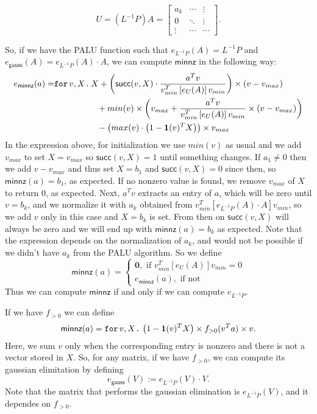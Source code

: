 \[
U=(L^{-1}P)A = \begin{bmatrix}
    a_k & \cdots &  \vdots \\
    0 & \ddots & \vdots \\
    \vdots & \cdots & \cdots 
\end{bmatrix}.
\]

So, if we have the PALU function such that $e_{L^{-1}P}(A)=L^{-1}P$ and $e_{\mathsf{gauss}}(A)=e_{L^{-1}P}(A)\cdot A$, we can compute $\mathsf{minnz}$ in the following way:
\begin{align*}
    e_{\mathsf{minnz}}(a)=&\texttt{for}\, v,X \texttt{.}\, X+\left( \mathsf{succ}(v,X)\cdot\dfrac{a^Tv}{v_{min}^T\left[ e_{U}(A)\right]v_{min}} \right)\times (v-v_{max}) \\
    &\hspace{5em} + min(v)\times\left( v_{max} + \dfrac{a^Tv}{v_{min}^T\left[ e_{U}(A)\right]v_{min}}\times (v-v_{max})\right) \\
    &\hspace{5em} - \left( max(v)\cdot\left( 1-\mathbf{1}(v)^TX \right)\right)\times v_{max}
\end{align*}
In the expression above, for initialization we use $min(v)$ as usual and we add $v_{max}$ to set $X=v_{max}$ so $\mathsf{succ}(v,X)=1$ until something changes. If $a_1\neq 0$ then we add $v-v_{max}$ and thus set $X=b_1$ and $\mathsf{succ}(v,X)=0$ since then, so $\mathsf{minnz}(a)=b_1$, as expected. If no nonzero value is found, we remove $v_{max}$ of $X$ to return $0$, as expected.
Next, $a^Tv$ extracts an entry of $a$, which will be zero until $v=b_k$, and we normalize it with $a_k$ obtained from $v_{min}^T\left[ e_{L^{-1}P}(A)\cdot A\right]v_{min}$, so we add $v$ only in this case and $X=b_k$ is set. From then on $\mathsf{succ}(v,X)$ will always be zero and we will end up with $\mathsf{minnz}(a)=b_k$ as expected. 
Note that the expression depends on the normalization of $a_k$, and would not be possible if we didn't have $a_k$ from the PALU algorithm.
So we define
\[
\mathsf{minnz}(a)=\begin{cases}
               \mathbf{0}, \text{ if } v_{min}^T\left[ e_{U}(A)\right]v_{min}=0 \\
               e_{\mathsf{minnz}}(a), \text{ if not}
            \end{cases}
\]
Thus we can compute $\mathsf{minnz}$ if and only if we can compute $e_{L^{-1}P}$.

If we have $f_{>0}$ we can define $$\mathsf{minnz}(a)=\texttt{for}\, v,X \texttt{.}\, \left( 1-\mathbf{1}(v)^TX \right) \times f_{>0}(v^Ta)\times v.$$
Here, we sum $v$ only when the corresponding entry is nonzero and there is not a vector stored in $X$.
So, for any matrix, if we have $f_{>0}$, we can compute its gaussian elimitation by defining
$$
e_{\mathsf{gauss}}(V) :=  e_{L^{-1}P}(V) \cdot V.
$$
Note that the matrix that performs the gaussian elimination is $e_{L^{-1}P}(V)$, and it dependes on $f_{>0}$.
